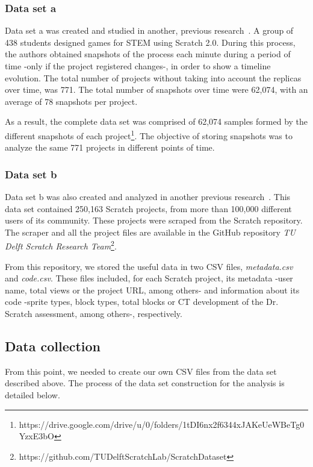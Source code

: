 \subsubsection{Data set a}
\label{subsubsec:dataset_a}

Data set a was created and studied in another, previous research~\cite{troiano2019my}. A group of 438 students designed games for STEM using Scratch 2.0. During this process, the authors obtained snapshots of the process each minute during a period of time -only if the project registered changes-, in order to show a timeline evolution. The total number of projects without taking into account the replicas over time, was 771. The total number of snapshots over time were 62,074, with an average of 78 snapshots per project.

As a result, the complete data set was comprised of 62,074 samples formed by the different snapshots of each project\footnote{https://drive.google.com/drive/u/0/folders/1tDI6nx2f6344xJAKeUeWBeTg0YzxE3bO}. The objective of storing snapshots was to analyze the same 771 projects in different points of time.

\subsubsection{Data set b}
\label{subsubsec:dataser_b}

Data set b was also created and analyzed in another previous research~\cite{aivaloglou2017dataset}. This data set contained 250,163 Scratch projects, from more than 100,000 different users of its community. These projects were scraped from the Scratch repository. The scraper and all the project files are available in the GitHub repository \textit{TU Delft Scratch Research Team}\footnote{https://github.com/TUDelftScratchLab/ScratchDataset}.

From this repository, we stored the useful data in two CSV files, \textit{metadata.csv} and \textit{code.csv}. These files included, for each Scratch project, its metadata -user name, total views or the project URL, among others- and information about its code -sprite types, block types, total blocks or CT development of the Dr. Scratch assessment, among others-, respectively.


\subsection{Data collection}
\label{subsec:datacollection}

From this point, we needed to create our own CSV files from the data set described above. The process of the data set construction for the analysis is detailed below.


